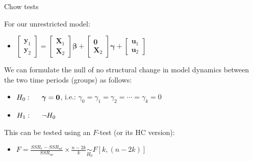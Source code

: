 \documentclass{beamer}
\begin{document}
\begin{frame}{Chow tests}

For  our unrestricted model:
\vspace{0.3cm}

\begin{itemize}

\item 
$ \begin{bmatrix} \bm{y}_1 \\ \bm{y}_2 \end{bmatrix} = 
\begin{bmatrix} \bm{X}_1 \\ \bm{X}_2 \end{bmatrix} \bm{\beta} +
\begin{bmatrix} \bm{0} \\ \bm{X}_2 \end{bmatrix} \bm{\gamma} +
\begin{bmatrix} \bm{u}_1 \\ \bm{u}_2 \end{bmatrix}$ \\
\vspace{0.3cm}
\end{itemize}

We can formulate the null of no structural change in model dynamics between the two time periods (groups) as follows:

\begin{itemize}
\item 
$ H_0: \hspace{0.5cm} \bm{\gamma}= \bm{0}$, i.e.: 
$\gamma_0 = \gamma_1 = \gamma_2= \cdots = \gamma_k=0 $
\item 
$ H_1: \hspace{0.5cm} \neg H_0$ 
\end{itemize}

This can be tested using an $F$-test (or its HC version): 
\vspace{0.3cm}
\begin{itemize}
\item 
$ F = \frac{\textit{SSR}_r- \textit{SSR}_{\textit{ur}}}{\textit{SSR}_{\textit{ur}}} \times \frac{n-2k}{k} \underset{H_0}{\sim } 
F[k, (n-2k)] $ 
\end{itemize}



\end{frame}



\end{document}
